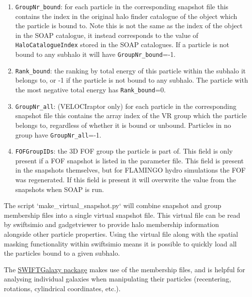 \documentclass{article}
\begin{document}
\begin{enumerate}
\item \verb|GroupNr_bound|: for each particle in the corresponding snapshot
  file this contains the index in the original halo finder catalogue of the object 
  which the particle is bound to. Note this is not the same as the index of the object
  in the SOAP catalogue, it instead corresponds to the value of \verb|HaloCatalogueIndex|
  stored in the SOAP catalogues. If a particle is not bound to any subhalo it
  will have \verb|GroupNr_bound|=-1.
\item \verb|Rank_bound|: the ranking by total energy of this particle within
  the subhalo it belongs to, or -1 if the particle is not bound to
  any subhalo. The particle with the most negative total energy has
  \verb|Rank_bound|=0.
\item \verb|GroupNr_all|: (VELOCIraptor only) for each particle in the
  corresponding snapshot
  file this contains the array index of the VR group which the
  particle belongs to, regardless of whether it is bound or
  unbound. Particles in no group have \verb|GroupNr_all|=-1.
\item \verb|FOFGroupIDs|: the 3D FOF group the particle is part of.
  This field is only present if a FOF snapshot is listed in the
  parameter file. This field is present in the snapshots themselves,
  but for FLAMINGO hydro simulations the FOF was regenerated. If this
  field is present it will overwrite the value from the snapshots when
  SOAP is run.
\end{enumerate}

The script `make\_virtual\_snapshot.py` will combine snapshot and group membership files
into a single virtual snapshot file. This virtual file can be read by swiftsimio and 
gadgetviewer to provide halo membership information alongside other particle properties.
Using the virtual file along with the spatial masking functionality within swiftsimio
means it is possible to quickly load all the particles bound to a given subhalo.

The \href{https://swiftgalaxy.readthedocs.io/en/latest/index.html}{SWIFTGalaxy package}
makes use of the membership files, and is helpful for analysing individual galaxies when 
manipulating their particles (recentering, rotations, cylindrical coordinates, etc.).
\end{document}
